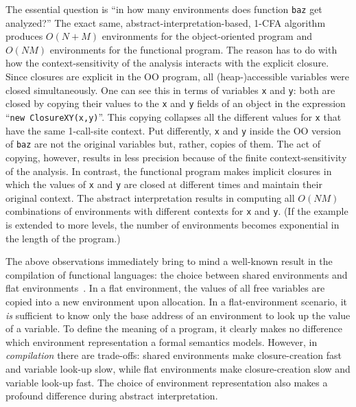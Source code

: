 The essential question is ``in how many environments does function
\texttt{baz} get analyzed?'' The exact same,
abstract-interpretation-based, 1-CFA{} algorithm produces $O(N+M)$
environments for the object-oriented program and $O(NM)$ environments
for the functional program. The reason has to do with how the
context-sensitivity of the analysis interacts with the explicit
closure. Since closures are explicit in the OO program, all
(heap-)accessible variables were closed simultaneously. One can see
this in terms of variables \texttt{x} and \texttt{y}: both are closed
by copying their values to the \texttt{x} and \texttt{y} fields of an
object in the expression ``\texttt{new ClosureXY(x,y)}''.  This
copying collapses all the different values for \texttt{x} that have
the same 1-call-site context. Put differently, \texttt{x} and
\texttt{y} inside the OO version of \texttt{baz} are not the original
variables but, rather, copies of them. The act of copying, however,
results in less precision because of the finite context-sensitivity of
the analysis. In contrast, the functional program makes implicit
closures in which the values of \texttt{x} and \texttt{y} are closed at
different times and maintain their original context. The abstract
interpretation results in computing all $O(NM)$ combinations of
environments with different contexts for \texttt{x} and
\texttt{y}. (If the example is extended to more levels, the number
of environments becomes exponential in the length of the program.)

The above observations immediately bring to mind a well-known result
in the compilation of functional languages: the choice between shared
environments and flat environments~\cite[page
  142]{dvanhorn:Appel1991Compiling}.
In a flat environment, the values of all free variables are copied
into a new environment upon allocation.
In a flat-environment scenario, it \emph{is} sufficient to know only
the base address of an environment to look up the value of a variable.
To define the meaning of a program, it clearly makes no difference which
environment representation a formal semantics models.
However, in \emph{compilation} there are trade-offs: shared
environments make closure-creation fast and variable look-up slow,
while flat environments make closure-creation slow and variable
look-up fast.
The choice of environment representation also makes a profound
difference during abstract interpretation.



























